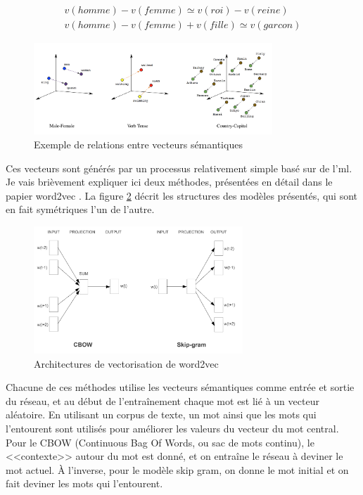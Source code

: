 \documentclass[openany, 11pt]{memoir}
\begin{document}
\begin{equation}
\begin{split}
	v(homme) - v(femme) \simeq v(roi) - v(reine)\\
	v(homme) - v(femme) + v(fille) \simeq v(garcon)
\end{split}
\end{equation}

\begin{figure}[ht]
	\centering
	\includegraphics[width=0.8\textwidth]{images/wordvec.png}
	\caption{Exemple de relations entre vecteurs sémantiques}
	\label{wordvec}
\end{figure}

Ces vecteurs sont générés par un processus relativement simple basé sur de l'\gls{ml}. Je vais brièvement expliquer ici deux méthodes, présentées en détail dans le papier word2vec \cite{word2vec}. La figure \ref{word2vec} décrit les structures des modèles présentés, qui sont en fait symétriques l'un de l'autre.

\begin{figure}[ht]
	\centering
	\includegraphics[width=0.7\textwidth]{images/word2vec.png}
	\caption{Architectures de vectorisation de word2vec}
	\label{word2vec}
\end{figure}

Chacune de ces méthodes utilise les vecteurs sémantiques comme entrée et sortie du réseau, et au début de l'entraînement chaque mot est lié à un vecteur aléatoire. En utilisant un corpus de texte, un mot ainsi que les mots qui l'entourent sont utilisés pour améliorer les valeurs du vecteur du mot central. Pour le CBOW (Continuous Bag Of Words, ou sac de mots continu), le <<contexte>> autour du mot est donné, et on entraîne le réseau à deviner le mot actuel. À l'inverse, pour le modèle skip gram, on donne le mot initial et on fait deviner les mots qui l'entourent.
\end{document}
